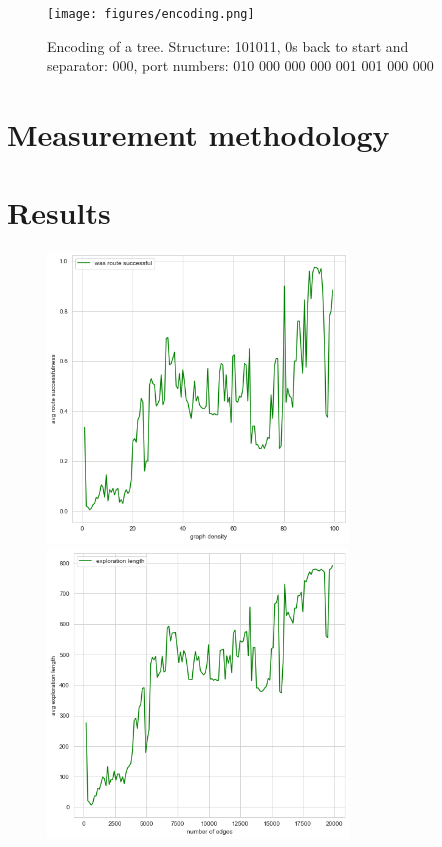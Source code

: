 \documentclass{article}
\begin{document}
\begin{figure}
  \centering
  \texttt{[image: figures/encoding.png]}
  \caption{Encoding of a tree. Structure: 101011, 0s back to start and separator: 000, port numbers: 010 000 000 000 001 001 000 000}
  \label{fig:encoding}
\end{figure}

\section{Measurement methodology}
\label{sec:method}


\section{Results}
\label{sec:results}

\begin{landscape}
\begin{figure}
  \vspace{-2.9cm}
  \centering
  \includegraphics[width=8cm]{figures/random_uj/edge_den_succ.png}
  \hspace{1cm}
  \includegraphics[width=8cm]{figures/random_uj/edge_expl.png}
  \vspace{1cm}


\end{figure}
\end{landscape}
\end{document}
